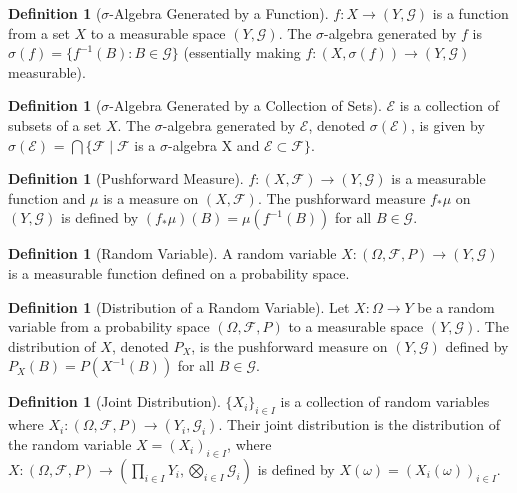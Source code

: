 \documentclass[11pt]{amsart}
\theoremstyle{plain}
\theoremstyle{definition}
\newtheorem{definition}[theorem]{Definition}
\theoremstyle{remark}
\numberwithin{equation}{section}
\begin{document}
{\begin{definition}[$\sigma$-Algebra Generated by a Function]
$f: X \to (Y, \mathcal{G})$ is a function from a set $X$ to a measurable space $(Y, \mathcal{G})$. The $\sigma$-algebra generated by $f$ is $\sigma(f) = \{f^{-1}(B) : B \in \mathcal{G}\}$ (essentially making $f:(X,\sigma(f)) \to (Y,\mathcal{G})$ measurable).
\end{definition}

\begin{definition}[$\sigma$-Algebra Generated by a Collection of Sets]
$\mathcal{E}$ is a collection of subsets of a set $X$. The $\sigma$-algebra generated by $\mathcal{E}$, denoted $\sigma(\mathcal{E})$, is given by $\sigma(\mathcal{E})$ = $\bigcap \{\mathcal{F} \mid \mathcal{F}$ is a $\sigma$-algebra X and $\mathcal{E} \subset \mathcal{F}\}$.
\end{definition}

\begin{definition}[Pushforward Measure]
$f: (X, \mathcal{F}) \to (Y, \mathcal{G})$ is a measurable function and $\mu$ is a measure on $(X, \mathcal{F})$. The pushforward measure $f_* \mu$ on $(Y, \mathcal{G})$ is defined by $(f_* \mu)(B) = \mu(f^{-1}(B))$ for all $B \in \mathcal{G}$.
\end{definition}

\begin{definition}[Random Variable]
A random variable $X: (\Omega,\mathcal{F},P) \to (Y,\mathcal{G})$ is a measurable function defined on a probability space.
\end{definition}

\begin{definition}[Distribution of a Random Variable]
Let $X: \Omega \to Y$ be a random variable from a probability space $(\Omega, \mathcal{F}, P)$ to a measurable space $(Y, \mathcal{G})$. The distribution of $X$, denoted $P_X$, is the pushforward measure on $(Y, \mathcal{G})$ defined by $P_X(B) = P(X^{-1}(B))$ for all $B \in \mathcal{G}$.
\end{definition}

\begin{definition}[Joint Distribution]
$\{X_i\}_{i \in I}$ is a collection of random variables where $X_i : (\Omega, \mathcal{F}, P) \to (Y_i, \mathcal{G}_i)$. Their joint distribution is the distribution of the random variable $X = (X_i)_{i \in I}$, where $X: (\Omega, \mathcal{F}, P) \to (\prod_{i \in I} Y_i, \bigotimes_{i \in I} \mathcal{G}_i)$ is defined by $X(\omega) = (X_i(\omega))_{i \in I}$.
\end{definition}

}
\end{document}
